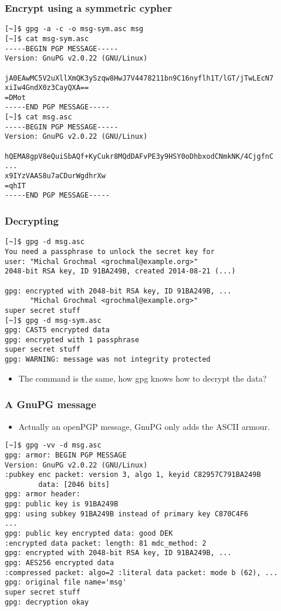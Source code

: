 \documentclass[hyperref={colorlinks=true}]{beamer}
\begin{document}
\begin{frame}[fragile]\frametitle{Encrypt using a symmetric cypher}
{\footnotesize
\begin{verbatim}
[~]$ gpg -a -c -o msg-sym.asc msg
[~]$ cat msg-sym.asc
-----BEGIN PGP MESSAGE-----
Version: GnuPG v2.0.22 (GNU/Linux)

jA0EAwMC5V2uXllXmQK3ySzqw8HwJ7V4478211bn9C16nyflh1T/lGT/jTwLEcN7
xiIw4GndX0z3CayQXA==
=DMot
-----END PGP MESSAGE-----
[~]$ cat msg.asc
-----BEGIN PGP MESSAGE-----
Version: GnuPG v2.0.22 (GNU/Linux)

hQEMA8gpV8eQuiSbAQf+KyCukr8MQdDAFvPE3y9HSY0oDhbxodCNmkNK/4CjgfnC
...
x9IYzVAAS8u7aCDurWgdhrXw
=qhIT
-----END PGP MESSAGE-----
\end{verbatim}
}
\end{frame}

\begin{frame}[fragile]\frametitle{Decrypting}
{\footnotesize
\begin{verbatim}
[~]$ gpg -d msg.asc
You need a passphrase to unlock the secret key for
user: "Michal Grochmal <grochmal@example.org>"
2048-bit RSA key, ID 91BA249B, created 2014-08-21 (...)

gpg: encrypted with 2048-bit RSA key, ID 91BA249B, ...
      "Michal Grochmal <grochmal@example.org>"
super secret stuff
[~]$ gpg -d msg-sym.asc
gpg: CAST5 encrypted data
gpg: encrypted with 1 passphrase
super secret stuff
gpg: WARNING: message was not integrity protected
\end{verbatim}
}
  \begin{itemize}
    \item The command is the same, how gpg knows how to decrypt the data?
  \end{itemize}
\end{frame}

\begin{frame}[fragile]\frametitle{A GnuPG message}
  \begin{itemize}
    \item Actually an openPGP message, GnuPG only adds the ASCII armour.
  \end{itemize}
{\scriptsize
\begin{verbatim}
[~]$ gpg -vv -d msg.asc
gpg: armor: BEGIN PGP MESSAGE
Version: GnuPG v2.0.22 (GNU/Linux)
:pubkey enc packet: version 3, algo 1, keyid C82957C791BA249B
        data: [2046 bits]
gpg: armor header:
gpg: public key is 91BA249B
gpg: using subkey 91BA249B instead of primary key C870C4F6
...
gpg: public key encrypted data: good DEK
:encrypted data packet: length: 81 mdc_method: 2
gpg: encrypted with 2048-bit RSA key, ID 91BA249B, ...
gpg: AES256 encrypted data
:compressed packet: algo=2 :literal data packet: mode b (62), ...
gpg: original file name='msg'
super secret stuff
gpg: decryption okay
\end{verbatim}
}
\end{frame}
\end{document}
